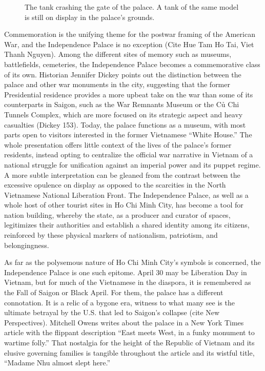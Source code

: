 \begin{figure}[!ht]
\begin{center}
\vspace{-.2 in}
\caption{\vi The tank crashing the gate of the palace. A tank of the same model is still on display in the palace's grounds.}\label{tank}
\end{center}
\vspace{-.2 in}
\end{figure}

\vi Commemoration is the unifying theme for the postwar framing of the American War, and the Independence Palace is no exception (Cite Hue Tam Ho Tai, Viet Thanh Nguyen). Among the different sites of memory such as museums, battlefields, cemeteries, the Independence Palace becomes a commemorative class of its own. Historian Jennifer Dickey points out the distinction between the palace and other war monuments in the city, suggesting that the former Presidential residence provides a more upbeat take on the war than some of its counterparts in Saigon, such as the War Remnants Museum or the Củ Chi Tunnels Complex, which are more focused on its strategic aspect and heavy casualties (Dickey 153). Today, the palace functions as a museum, with most parts open to visitors interested in the former Vietnamese “White House.” The whole presentation offers little context of the lives of the palace’s former residents, instead opting to centralize the official war narrative in Vietnam of a national struggle for unification against an imperial power and its puppet regime. A more subtle interpretation can be gleaned from the contrast between the excessive opulence on display as opposed to the scarcities in the North Vietnamese National Liberation Front. The Independence Palace, as well as a whole host of other tourist sites in Ho Chi Minh City, has become a tool for nation building, whereby the state, as a producer and curator of spaces, legitimizes their authorities and establish a shared identity among its citizens, reinforced by these physical markers of nationalism, patriotism, and belongingness.

As far as the polysemous nature of Ho Chi Minh City’s symbols is concerned, the Independence Palace is one such epitome. April 30 may be Liberation Day in Vietnam, but for much of the Vietnamese in the diaspora, it is remembered as the Fall of Saigon or Black April.  For them, the palace has a different connotation. It is a relic of a bygone era, witness to what many see is the ultimate betrayal by the U.S. that led to Saigon’s collapse (cite New Perspectives). Mitchell Owens writes about the palace in a New York Times article with the flippant description “East meets West, in a funky monument to wartime folly.” That nostalgia for the height of the Republic of Vietnam and its elusive governing families is tangible throughout the article and its wistful title, “Madame Nhu almost slept here.” 

